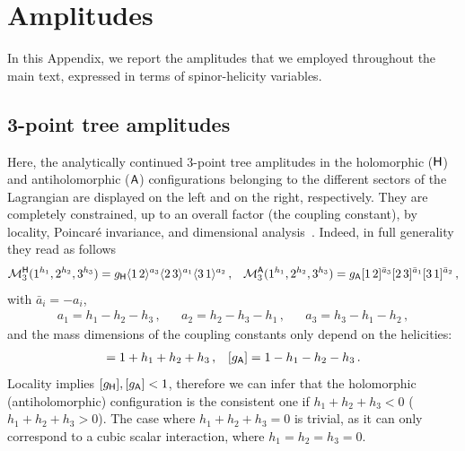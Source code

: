\section{Amplitudes}
\label{app:Amplitudes}

In this Appendix, we report the amplitudes that we employed throughout the main text, expressed in terms of spinor-helicity variables.

\subsection{3-point tree amplitudes}
Here, the analytically continued 3-point tree amplitudes in the holomorphic ($\mathsf{H}$) and antiholomorphic ($\mathsf{A}$) configurations belonging to the different sectors of the Lagrangian are displayed on the left and on the right, respectively.
They are completely constrained, up to an overall factor (the coupling constant), by locality, Poincaré invariance, and dimensional analysis~\cite{Benincasa:2007xk}. Indeed, in full generality they read as follows
\begin{align}
    \mathcal M_3^{\mathsf{H}}(1^{h_1},2^{h_2},3^{h_3}) = g_{\mathsf{H}} \langle1\, 2 \rangle^{a_3}\langle2\, 3 \rangle^{a_1}\langle3\, 1 \rangle^{a_2}\,, &&
    \mathcal M_3^{\mathsf{A}}(1^{h_1},2^{h_2},3^{h_3}) = g_{\mathsf{A}} \lbrack 1\, 2 \rbrack^{\bar a_3}\lbrack 2\, 3 \rbrack^{\bar a_1}\lbrack 3\, 1 \rbrack^{\bar a_2}\,,
\end{align}
with $\bar a_i=-a_i$,
\begin{align}
    a_1= h_1-h_2-h_3\,,&&
    a_2= h_2-h_3-h_1\,, &&
    a_3= h_3-h_1-h_2\,,
\end{align}
and the mass dimensions of the coupling constants only depend on the helicities:
\begin{align}
    [g_\hol]=1+h_1+h_2+h_3\,, && 
    [g_\ahol]=1-h_1-h_2-h_3\,.
\end{align}
Locality implies $[g_{\mathsf{H}}],[g_{\mathsf{A}}]<1$, therefore we can infer that the holomorphic (antiholomorphic) configuration is the consistent one if $h_1+h_2+h_3<0$ ($h_1+h_2+h_3>0$).
The case where $h_1+h_2+h_3=0$ is trivial, as it can only correspond to a cubic scalar interaction, where $h_1=h_2=h_3=0$.

